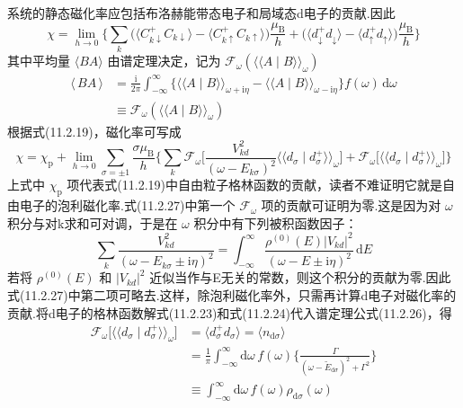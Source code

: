 系统的静态磁化率应包括布洛赫能带态电子和局域态d电子的贡献.因此
\begin{equation}
  \chi=\lim_{h\to0}\biggl\{\sum_{k}
  \bigl(\langle C^{+}_{k\downarrow}C_{k\downarrow}\rangle
  -\langle C^{+}_{k\uparrow}C_{k\uparrow}\rangle\bigr)\frac{\mu_{\mathrm{B}}}{h}
  +\bigl(\langle d^{+}_{\downarrow}d_{\downarrow}\rangle
  -\langle d^{+}_{\uparrow}d_{\uparrow}\rangle\bigr)\frac{\mu_{\mathrm{B}}}{h}\biggr\}
\end{equation}
其中平均量 $\langle BA\rangle$ 由谱定理决定，记为 $\mathscr{F}_{\omega}(\langle\langle A\mid B\rangle\rangle_{\omega})$
\begin{equation}
\begin{aligned}
  \langle\,BA\,\rangle&=\frac{\mathrm{i}}{2\pi}\int_{-\infty}^{\infty}
  \bigl\{\langle\langle A\mid B\rangle\rangle_{\omega+\mathrm{i}\eta}
  -\langle\langle A\mid B\rangle\rangle_{\omega-\mathrm{i}\eta}\bigr\}
  f(\omega)\,\mathrm{d}\omega\\
  &\equiv\mathscr{F}_{\omega}(\langle\langle A\mid B\rangle\rangle_{\omega})
\end{aligned}
\end{equation}
根据式(11.2.19)，磁化率可写成
\begin{equation}
  \chi=\chi_{\mathrm{p}}+\lim_{h\to0}\sum_{\sigma=\pm1}\frac{\sigma\mu_{\mathrm{B}}}{h}
  \biggl\{\sum_{k}\mathscr{F}_{\omega}\biggl[\frac{V^{2}_{kd}}{(\omega-E_{k\sigma})^{2}}
  \langle\langle d_{\sigma}\mid d^{+}_{\sigma}\rangle\rangle_{\omega}\biggr]
  +\mathscr{F}_{\omega}\bigl[\langle\langle d_{\sigma}\mid d^{+}_{\sigma}\rangle\rangle_{\omega}\bigr]\biggr\}
\end{equation}
上式中 $\chi_{\mathrm{p}}$ 项代表式(11.2.19)中自由粒子格林函数的贡献，读者不难证明它就是自由电子的泡利磁化率.式(11.2.27)中第一个 $\mathscr{F}_{\omega}$ 项的贡献可证明为零.这是因为对 $\omega$ 积分与对k求和可对调，于是在 $\omega$ 积分中有下列被积函数因子：
\begin{equation*}
  \sum_{k}\frac{V^{2}_{kd}}{(\omega-E_{k\sigma}\pm\mathrm{i}\eta)^{2}}
  =\int_{-\infty}^{\infty}
  \frac{\rho^{(0)}(E)|V_{kd}|^{2}}{(\omega-E\pm\mathrm{i}\eta)^{2}}\,\mathrm{d}E
\end{equation*}
若将 $\rho^{(0)}(E)$ 和 $|V_{kd}|^{2}$ 近似当作与E无关的常数，则这个积分的贡献为零.因此式(11.2.27)中第二项可略去.这样，除泡利磁化率外，只需再计算d电子对磁化率的贡献.将d电子的格林函数解式(11.2.23)和式(11.2.24)代入谱定理公式(11.2.26)，得
\begin{equation}
\begin{aligned}
  \mathscr{F}_{\omega}\bigl[\langle\langle d_{\sigma}\mid d^{+}_{\sigma}\rangle\rangle_{\omega}\bigr]
  &=\langle d^{+}_{\sigma}d_{\sigma}\rangle
  =\langle n_{\mathrm{d}\sigma}\rangle\\
  &=\frac{1}{\pi}\int_{-\infty}^{\infty}\mathrm{d}\omega\,f(\omega)
  \biggl\{\frac{\Gamma}{(\omega-\tilde{E}_{\mathrm{d}\sigma})^{2}+\Gamma^{2}}\biggr\}\\
  &\equiv\int_{-\infty}^{\infty}\mathrm{d}\omega\,f(\omega)\rho_{\mathrm{d}\sigma}(\omega)
\end{aligned}
\end{equation}

